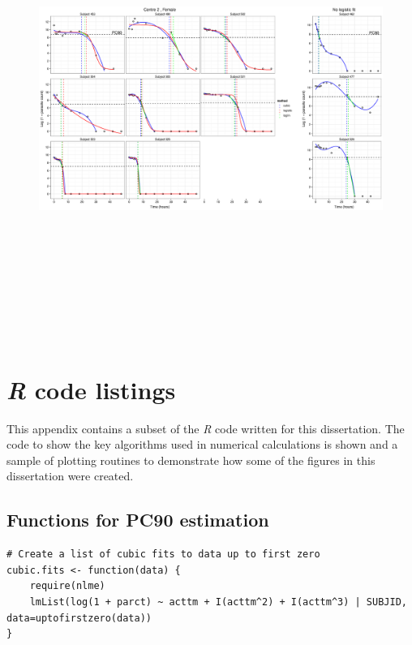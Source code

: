 \begin{singlespace}
\begin{figure}
\end{figure}
\begin{figure}
\centering
\includegraphics[height=150mm]{Afits2F.eps}
\end{figure}

\chapter{\emph{R} code listings}
\lstset{numberstyle=\small,
frame=single,
framesep=6pt,
tabsize=2,
basicstyle=\small\ttfamily,
showstringspaces=false,
columns = fullflexible,
language=R,
breaklines=true,
showstringspaces=false,
lineskip=-1pt}

This appendix contains a subset of the \emph{R} code written for this dissertation. The code to show the key algorithms used in numerical calculations is shown and a sample of plotting routines to demonstrate how some of the figures in this dissertation were created.

\section{Functions for PC90 estimation}\label{R:PC90}
\begin{lstlisting}[caption=Functions to find PC90 by cubic regression,label=R:cubics]
# Create a list of cubic fits to data up to first zero
cubic.fits <- function(data) {
	require(nlme)
	lmList(log(1 + parct) ~ acttm + I(acttm^2) + I(acttm^3) | SUBJID, data=uptofirstzero(data))
}


\end{lstlisting}
\end{singlespace}
